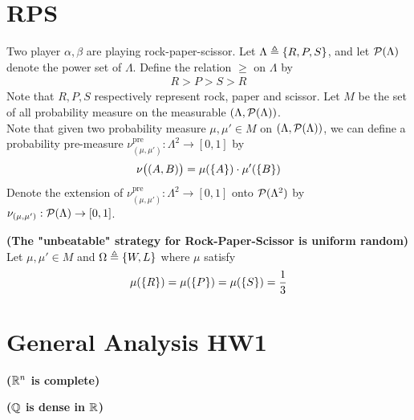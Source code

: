\documentclass{report}
\begin{document}
\section{RPS}
\begin{mdframed}
Two player $\alpha ,\beta $ are playing rock-paper-scissor. Let $\Lambda \triangleq \{ R,P,S \}$, and let $\mathcal{P}(\Lambda )$ denote the power set of $\Lambda $. Define the relation $\geq $ on $\Lambda $ by
\begin{align*}
R>P>S>R
\end{align*}
Note that $R,P,S$ respectively represent rock, paper and scissor. Let $M$ be the set of all probability measure on the measurable $(\Lambda ,\mathcal{P}(\Lambda ))$.\\

Note that given two probability measure $\mu,\mu'\in M$ on $(\Lambda ,\mathcal{P}(\Lambda ))$, we can define a probability pre-measure $\nu_{(\mu,\mu')}^{\text{pre}}:\Lambda ^2 \rightarrow [0,1]$ by 
\begin{align*}
\nu \big((A,B) \big)= \mu (\{ A \}) \cdot\mu' (\{ B \})    
\end{align*}
Denote the extension of $\nu^{\text{pre}}_{(\mu,\mu')}:\Lambda^2 \rightarrow [0,1]$ onto $\mathcal{P}(\Lambda^2)$ by $\nu_{(\mu,\mu')}:\mathcal{P}(\Lambda )\rightarrow [0,1]$. 
\end{mdframed}
\begin{theorem}
\textbf{(The "unbeatable" strategy for Rock-Paper-Scissor is uniform random)} Let $\mu,\mu'\in M$ and $\Omega\triangleq \{ W,L \}$ where $\mu$ satisfy 
\begin{align*}
\mu (\{ R \})=\mu (\{ P \})= \mu (\{ S \})=\frac{1}{3}
\end{align*}

\end{theorem}
\section{General Analysis HW1}
\begin{theorem}
\textbf{($\mathbb{R}^n$ is complete)} 
\end{theorem}
\begin{theorem}
\textbf{($\mathbb{Q}$ is dense in $\mathbb{R}$)}
\end{theorem}
\end{document}
